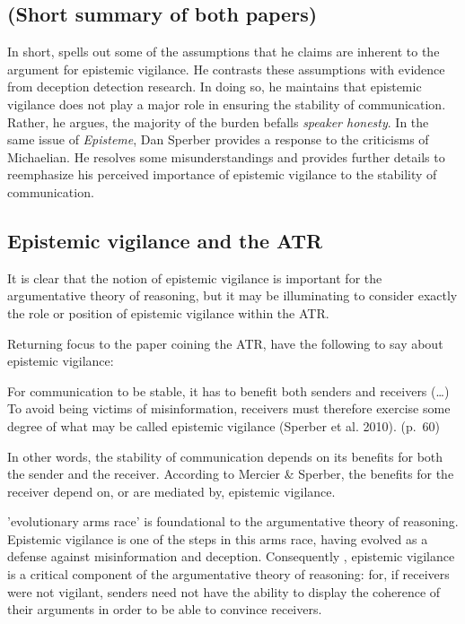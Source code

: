 \subsection*{(Short summary of both papers)}

In short, \citet{Michaelian13} spells out some of the assumptions that he claims are inherent to the argument for epistemic vigilance. He contrasts these assumptions with evidence from deception detection research. In doing so, he maintains that epistemic vigilance does not play a major role in ensuring the stability of communication. Rather, he argues, the majority of the burden befalls \emph{speaker honesty}. In the same \citeyear{Sperber13} issue of \emph{Episteme}, Dan Sperber provides a response to the criticisms of Michaelian. He resolves some misunderstandings and provides further details to reemphasize his perceived importance of epistemic vigilance to the stability of communication.

\subsection{Epistemic vigilance and the ATR}
\label{sec:epi-vigil-atr}

It is clear that the notion of epistemic vigilance is important for the argumentative theory of reasoning, but it may be illuminating to consider exactly the role or position of epistemic vigilance within the ATR.

Returning focus to the paper coining the ATR, \citet{MS11} have the following to say about epistemic vigilance:

\begin{quoting}
    For communication to be stable, it has to benefit both senders and receivers (\ldots) To avoid being victims of misinformation, receivers must therefore exercise some degree of what may be called epistemic vigilance (Sperber et al. 2010).
\hfill (p.~60)
\end{quoting}
In other words, the stability of communication depends on its benefits for both the sender and the receiver. According to Mercier \& Sperber, the benefits for the receiver depend on, or are mediated by, epistemic vigilance.

 'evolutionary arms race' is foundational to the argumentative theory of reasoning. Epistemic vigilance is one of the steps in this arms race, having evolved as a defense against misinformation and deception. Consequently , epistemic vigilance is a critical component of the argumentative theory of reasoning: for, if receivers were not vigilant, senders need not have the ability to display the coherence of their arguments in order to be able to convince receivers.

